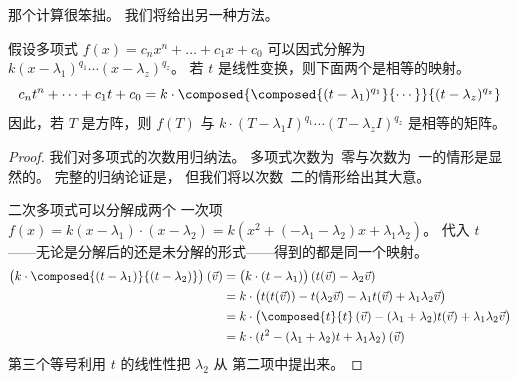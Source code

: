 那个计算很笨拙。
我们将给出另一种方法。

\begin{lemma} \label{le:PolyMapsFactor}
假设多项式 \( f(x)=c_nx^n+\dots+c_1x+c_0 \) 可以因式分解为
\( k(x-\lambda_1)^{q_1}\cdots(x-\lambda_z)^{q_z} \)。
若 \( t \) 是线性变换，则下面两个是相等的映射。
\begin{equation*}
  c_nt^n+\dots+c_1t+c_0
  =
  k\cdot\composed{\composed{(t-\lambda_1)^{q_1}}{\cdots}}{
      (t-\lambda_z)^{q_z}} 
\end{equation*}
因此，若 \( T \) 是方阵，则 \( f(T) \) 与
\( k\cdot(T-\lambda_1I)^{q_1}\cdots(T-\lambda_z I)^{q_z} \) 
是相等的矩阵。
\end{lemma}

\begin{proof}
我们对多项式的次数用归纳法。
多项式次数为~零与次数为~一的情形是显然的。
完整的归纳论证是，
但我们将以次数~二的情形给出其大意。

二次多项式可以分解成两个
一次项 \( f(x)=k(x-\lambda_1)\cdot(x-\lambda_2)
                    =k(x^2+(-\lambda_1-\lambda_2)x+\lambda_1\lambda_2) \)。
代入 \( t \) 
——无论是分解后的还是未分解的形式——得到的都是同一个映射。
\begin{align*}
   \bigl(k\cdot\composed{(t-\lambda_1)}{(t-\lambda_2)}\bigr)\>(\vec{v})
   &=\bigl(k\cdot(t-\lambda_1)\bigr)\,(t(\vec{v})-\lambda_2\vec{v})    \\
   &=k\cdot\bigl(t(t(\vec{v}))-t(\lambda_2\vec{v})
      -\lambda_1 t(\vec{v})+\lambda_1\lambda_2\vec{v}\bigr)    \\
   &=k\cdot \bigl(\composed{t}{t}\,(\vec{v})-(\lambda_1+\lambda_2)t(\vec{v})
          +\lambda_1\lambda_2\vec{v}\bigr)                    \\
   &=k\cdot(t^2-(\lambda_1+\lambda_2)t+\lambda_1\lambda_2)\>(\vec{v})
\end{align*}
第三个等号利用 \( t \) 的线性性把 $\lambda_2$ 从
第二项中提出来。
\end{proof}


